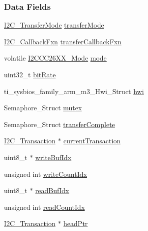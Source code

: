 \subsubsection*{Data Fields}
\begin{DoxyCompactItemize}
\item 
\hyperlink{_i2_c_8h_a39f3b9340fc4ee241b0d2da9b2841c26}{I2\+C\+\_\+\+Transfer\+Mode} \hyperlink{struct_i2_c_c_c26_x_x___object_a64cd64cf328013bebacf75feaa17f127}{transfer\+Mode}
\item 
\hyperlink{_i2_c_8h_aa7389002843eba77425c73b441358fd1}{I2\+C\+\_\+\+Callback\+Fxn} \hyperlink{struct_i2_c_c_c26_x_x___object_ad8faa83bb84c09307294134d9fd9d454}{transfer\+Callback\+Fxn}
\item 
volatile \hyperlink{_i2_c_c_c26_x_x_8h_a9deb519e150efd12ccf7068efca5ee75}{I2\+C\+C\+C26\+X\+X\+\_\+\+Mode} \hyperlink{struct_i2_c_c_c26_x_x___object_a5d9b9f0f08afda1776a2f3caa155bda5}{mode}
\item 
uint32\+\_\+t \hyperlink{struct_i2_c_c_c26_x_x___object_a8544e07d83b25c67b957c58a9a0e4317}{bit\+Rate}
\item 
ti\+\_\+sysbios\+\_\+family\+\_\+arm\+\_\+m3\+\_\+\+Hwi\+\_\+\+Struct \hyperlink{struct_i2_c_c_c26_x_x___object_a759e20bc1c388f73638963c20d99cd09}{hwi}
\item 
Semaphore\+\_\+\+Struct \hyperlink{struct_i2_c_c_c26_x_x___object_a84660b6df95d3cad705c774609f4e29f}{mutex}
\item 
Semaphore\+\_\+\+Struct \hyperlink{struct_i2_c_c_c26_x_x___object_a98865f00b814edcc3480e64e55f8405d}{transfer\+Complete}
\item 
\hyperlink{struct_i2_c___transaction}{I2\+C\+\_\+\+Transaction} $\ast$ \hyperlink{struct_i2_c_c_c26_x_x___object_aa14b9975af2982d7c84646b91c1a6ad5}{current\+Transaction}
\item 
uint8\+\_\+t $\ast$ \hyperlink{struct_i2_c_c_c26_x_x___object_a8175be0691405f4398d2734492e534ed}{write\+Buf\+Idx}
\item 
unsigned int \hyperlink{struct_i2_c_c_c26_x_x___object_a8b01e2705b597bc44164bafa3a14af6e}{write\+Count\+Idx}
\item 
uint8\+\_\+t $\ast$ \hyperlink{struct_i2_c_c_c26_x_x___object_ad39b7ffb7de097aecda32d14005df8cd}{read\+Buf\+Idx}
\item 
unsigned int \hyperlink{struct_i2_c_c_c26_x_x___object_a012990d843f7189a488e072708bb4490}{read\+Count\+Idx}
\item 
\hyperlink{struct_i2_c___transaction}{I2\+C\+\_\+\+Transaction} $\ast$ \hyperlink{struct_i2_c_c_c26_x_x___object_a7148eed6e39ab2ab626c53030c7b77bb}{head\+Ptr}

\end{DoxyCompactItemize}
